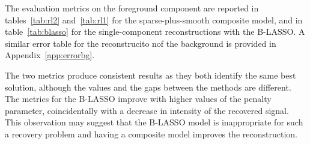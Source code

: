 \documentclass[12pt]{article}
\begin{document}
        The evaluation metrics on the foreground component are reported in tables~\ref{tab:rl2} and~\ref{tab:rl1} for the sparse-plus-smooth composite model, and in table~\ref{tab:blasso} for the single-component reconstructions with the B-LASSO. A similar error table for the reconstrucito nof the background is provided in Appendix~\ref{app:errorbg}.

        The two metrics produce consistent results as they both identify the same best solution, although the values and the gaps between the methods are different. The metrics for the B-LASSO improve with higher values of the penalty parameter, coincidentally with a decrease in intensity of the recovered signal. This observation may suggest that the B-LASSO model is inappropriate for such a recovery problem and having a composite model improves the reconstruction. 
        
\end{document}

